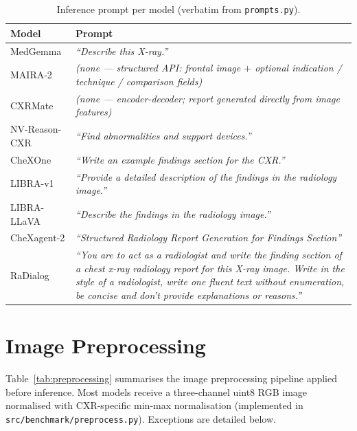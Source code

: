 \documentclass[10pt,a4paper]{article}
\begin{document}
\begin{table}[ht]
\centering
\caption{Inference prompt per model (verbatim from \texttt{prompts.py}).}
\label{tab:prompts}
\small
\begin{tabular}{L{2.4cm} L{11.0cm}}
\toprule
\textbf{Model} & \textbf{Prompt} \\
\midrule
MedGemma
  & \textit{``Describe this X-ray.''} \\
\midrule
MAIRA-2
  & \textit{(none — structured API: frontal image $+$ optional indication /
    technique / comparison fields)} \\
\midrule
CXRMate
  & \textit{(none — encoder-decoder; report generated directly from image
    features)} \\
\midrule
NV-Reason-CXR
  & \textit{``Find abnormalities and support devices.''} \\
\midrule
CheXOne
  & \textit{``Write an example findings section for the CXR.''} \\
\midrule
LIBRA-v1
  & \textit{``Provide a detailed description of the findings in the
    radiology image.''} \\
\midrule
LIBRA-LLaVA
  & \textit{``Describe the findings in the radiology image.''} \\
\midrule
CheXagent-2
  & \textit{``Structured Radiology Report Generation for Findings
    Section''} \\
\midrule
RaDialog
  & \textit{``You are to act as a radiologist and write the finding section
    of a chest x-ray radiology report for this X-ray image.
    Write in the style of a radiologist, write one fluent text without
    enumeration, be concise and don't provide explanations or reasons.''} \\
\bottomrule
\end{tabular}
\end{table}

\section{Image Preprocessing}
\label{sec:preprocessing}

Table~\ref{tab:preprocessing} summarises the image preprocessing pipeline
applied before inference.
Most models receive a three-channel uint8 RGB image normalised with
CXR-specific min-max normalisation (implemented in
\texttt{src/benchmark/preprocess.py}).
Exceptions are detailed below.
\end{document}
